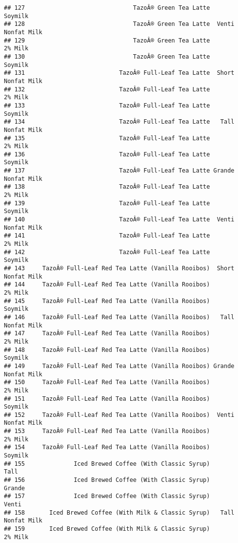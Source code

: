 \documentclass[
]{article}
\begin{document}
\begin{verbatim}
## 127                               TazoÂ® Green Tea Latte            Soymilk
## 128                               TazoÂ® Green Tea Latte  Venti Nonfat Milk
## 129                               TazoÂ® Green Tea Latte            2% Milk
## 130                               TazoÂ® Green Tea Latte            Soymilk
## 131                           TazoÂ® Full-Leaf Tea Latte  Short Nonfat Milk
## 132                           TazoÂ® Full-Leaf Tea Latte            2% Milk
## 133                           TazoÂ® Full-Leaf Tea Latte            Soymilk
## 134                           TazoÂ® Full-Leaf Tea Latte   Tall Nonfat Milk
## 135                           TazoÂ® Full-Leaf Tea Latte            2% Milk
## 136                           TazoÂ® Full-Leaf Tea Latte            Soymilk
## 137                           TazoÂ® Full-Leaf Tea Latte Grande Nonfat Milk
## 138                           TazoÂ® Full-Leaf Tea Latte            2% Milk
## 139                           TazoÂ® Full-Leaf Tea Latte            Soymilk
## 140                           TazoÂ® Full-Leaf Tea Latte  Venti Nonfat Milk
## 141                           TazoÂ® Full-Leaf Tea Latte            2% Milk
## 142                           TazoÂ® Full-Leaf Tea Latte            Soymilk
## 143     TazoÂ® Full-Leaf Red Tea Latte (Vanilla Rooibos)  Short Nonfat Milk
## 144     TazoÂ® Full-Leaf Red Tea Latte (Vanilla Rooibos)            2% Milk
## 145     TazoÂ® Full-Leaf Red Tea Latte (Vanilla Rooibos)            Soymilk
## 146     TazoÂ® Full-Leaf Red Tea Latte (Vanilla Rooibos)   Tall Nonfat Milk
## 147     TazoÂ® Full-Leaf Red Tea Latte (Vanilla Rooibos)            2% Milk
## 148     TazoÂ® Full-Leaf Red Tea Latte (Vanilla Rooibos)            Soymilk
## 149     TazoÂ® Full-Leaf Red Tea Latte (Vanilla Rooibos) Grande Nonfat Milk
## 150     TazoÂ® Full-Leaf Red Tea Latte (Vanilla Rooibos)            2% Milk
## 151     TazoÂ® Full-Leaf Red Tea Latte (Vanilla Rooibos)            Soymilk
## 152     TazoÂ® Full-Leaf Red Tea Latte (Vanilla Rooibos)  Venti Nonfat Milk
## 153     TazoÂ® Full-Leaf Red Tea Latte (Vanilla Rooibos)            2% Milk
## 154     TazoÂ® Full-Leaf Red Tea Latte (Vanilla Rooibos)            Soymilk
## 155              Iced Brewed Coffee (With Classic Syrup)               Tall
## 156              Iced Brewed Coffee (With Classic Syrup)             Grande
## 157              Iced Brewed Coffee (With Classic Syrup)              Venti
## 158       Iced Brewed Coffee (With Milk & Classic Syrup)   Tall Nonfat Milk
## 159       Iced Brewed Coffee (With Milk & Classic Syrup)            2% Milk

\end{verbatim}
\end{document}
